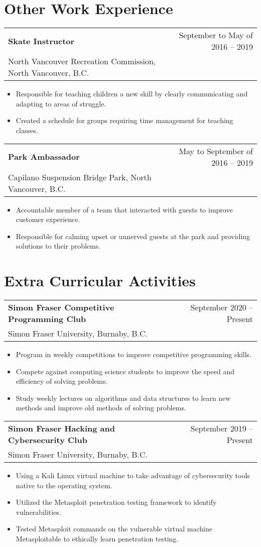 \documentclass[letterpaper, 11pt]{article}
\makeatletter
\newcommand{\infoSection}[3]{
  \vspace{0pt}
    \begin{tabular*}{0.97\textwidth}[t]{l@{\extracolsep{\fill}}r}
      \textbf{#1} & {#2} \\
      {\small#3} \\
    \end{tabular*}\vspace{0pt}
    \begin{itemize}
}
\newcommand{\resumeWorkExperienceLight}[5]{
  \vspace{-1pt}
    \begin{tabular*}{0.97\textwidth}[t]{l@{\extracolsep{\fill}}r}
      \textbf{#1} & #2 \\
      \small#3 \\
    \end{tabular*}\vspace{0pt}
    \begin{itemize}
        \item #4
        \item #5
    \end{itemize}
}
\newcommand{\infoSectionEnd}{\end{itemize}}
\makeatother
\begin{document}
\section{Other Work Experience}
    \resumeWorkExperienceLight
	{Skate Instructor} {September to May of 2016 -- 2019}
	{North Vancouver Recreation Commission, North Vancouver, B.C.}
	{Responsible for teaching children a new skill by clearly communicating and adapting to areas of struggle.}
	{Created a schedule for groups requiring time management for teaching classes.}
	\vspace{10pt}

    \resumeWorkExperienceLight
	{Park Ambassador} {May to September of 2016 -- 2019}
	{Capilano Suspension Bridge Park, North Vancouver, B.C.}
	{Accountable member of a team that interacted with guests to improve customer experience.}
	{Responsible for calming upset or unnerved guests at the park and providing solutions to their problems.}


\section{Extra Curricular Activities}
    \infoSection
    {Simon Fraser Competitive Programming Club} {September 2020 -- Present}
    {Simon Fraser University, Burnaby, B.C.}
      \item Program in weekly competitions to improve competitive programming skills.
      \item Compete against computing science students to improve the speed and efficiency of solving problems.
      \item Study weekly lectures on algorithms and data structures to learn new methods and improve old methods of solving problems.
    \infoSectionEnd
    \vspace{10pt}
    \infoSection
    {Simon Fraser Hacking and Cybersecurity Club} {September 2019 -- Present}
    {Simon Fraser University, Burnaby, B.C.}
      \item Using a Kali Linux virtual machine to take advantage of cybersecurity tools native to the operating system.
      \item Utilized the Metasploit penetration testing framework to identify vulnerabilities.
      \item Tested Metasploit commands on the vulnerable virtual machine Metasploitable to ethically learn penetration testing.
    \infoSectionEnd
\end{document}
